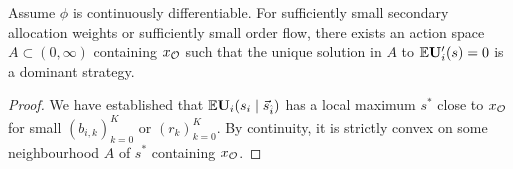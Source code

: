 \begin{comment}
\begin{lemma}

  Suppose $\phi$ is continuously differentiable and invertible, and that player $i$ has positive probability to be allocated a slot.
  If $r$ is small then $\Expectation\Utility_i\left(s_i\mid \vec{s}_{\hat{i}}\right)$ has local maximum close to $x_\oracle$.
  Its location does not depend on $\vec{s}_{\hat{i}}$.

\end{lemma}
%
\begin{proof}

  When $r=0$ we have
  \begin{equation} \label{expected-utility-derivative-zero-volume}
    \Expectation\Utility_i'(s\mid \vec{s}_{\hat{i}}) = \left( \sum_{k=0}^K a_{i,k}( 1- b_{i,k})\right)
      (\phi(s) - \phi(x_\oracle))
  \end{equation}
  whence $\Utility_i''(s)$ is a positive constant multiple of $\phi'(s)<0$ (recall that $b_{i,0}=0$, even for a monopolist).
  This is evidently independent of $\vec{s}_{\hat{i}}$.
  Thus $\Utility_i'$ has a simple zero at $x_\oracle$, which is a local minimum of $\Utility_i(s_i\mid s_{\hat{i}})$, and there is a neighbourhood $(a,b)$ of $x_\oracle$ such that $\Utility_i'(x)<0$ for $x\in (a,x_\oracle)$ and $\Utility_i'(x)>0$ for $x\in (x_\oracle,b)$.
  The claim then follows from a simple continuity argument.
  \qedhere
  
\end{proof}
\end{comment}

\begin{proposition} \label{dominant-strategy-unique}
  
  Assume $\phi$ is continuously differentiable.
  For sufficiently small secondary allocation weights or sufficiently small order flow, there exists an action space $A\subset(0,\infty)$ containing $x_{\mathcal{O}}$ such that the unique solution in $A$ to $\mathbb{E}\mathbf{U}'_i(s)=0$ is a dominant strategy.
  \qedhere

\end{proposition}
%
\begin{proof}

  We have established that $\mathbb{E}\mathbf{U}_i(s_i\mid \vec{s}_{\hat i})$ has a local maximum ${s^*}$ close to $x_{\mathcal{O}}$ for small $(b_{i,k})_{k=0}^K$ or $(r_k)_{k=0}^K$.
  By continuity, it is strictly convex on some neighbourhood $A$ of ${s^*}$ containing $x_{\mathcal{O}}$.

\end{proof}


